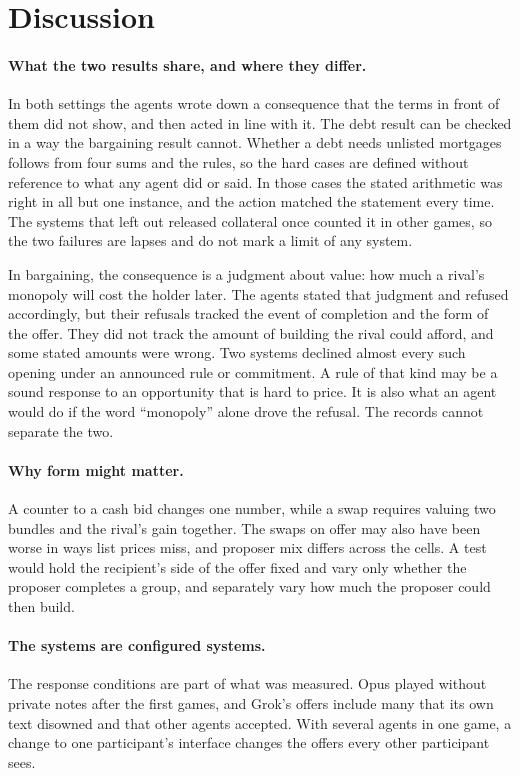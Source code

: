 \section{Discussion}
\label{sec:discussion}

\paragraph{What the two results share, and where they differ.}
In both settings the agents wrote down a consequence that the terms in front of them did not show, and then acted in line with it. The debt result can be checked in a way the bargaining result cannot. Whether a debt needs unlisted mortgages follows from four sums and the rules, so the hard cases are defined without reference to what any agent did or said. In those cases the stated arithmetic was right in all but one instance, and the action matched the statement every time. The systems that left out released collateral once counted it in other games, so the two failures are lapses and do not mark a limit of any system.

In bargaining, the consequence is a judgment about value: how much a rival's monopoly will cost the holder later. The agents stated that judgment and refused accordingly, but their refusals tracked the event of completion and the form of the offer. They did not track the amount of building the rival could afford, and some stated amounts were wrong. Two systems declined almost every such opening under an announced rule or commitment. A rule of that kind may be a sound response to an opportunity that is hard to price. It is also what an agent would do if the word ``monopoly'' alone drove the refusal. The records cannot separate the two.

\paragraph{Why form might matter.}
A counter to a cash bid changes one number, while a swap requires valuing two bundles and the rival's gain together. The swaps on offer may also have been worse in ways list prices miss, and proposer mix differs across the cells. A test would hold the recipient's side of the offer fixed and vary only whether the proposer completes a group, and separately vary how much the proposer could then build.

\paragraph{The systems are configured systems.}
The response conditions are part of what was measured. Opus played without private notes after the first games, and Grok's offers include many that its own text disowned and that other agents accepted. With several agents in one game, a change to one participant's interface changes the offers every other participant sees.

